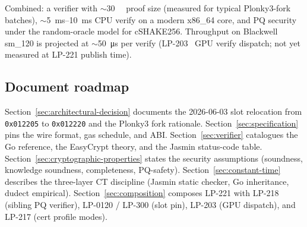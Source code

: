 Combined: a verifier with $\sim$\SI{30}{\kilo\byte} proof size
(measured for typical Plonky3-fork batches),
$\sim$\SIrange{5}{10}{\milli\second} CPU verify on a modern x86\_64
core, and PQ security under the random-oracle model for cSHAKE256.
Throughput on Blackwell sm\_120 is projected at $\sim$\SI{50}{\micro\second}
per verify (LP-203~\cite{lp203} GPU verify dispatch; not yet
measured at LP-221 publish time).

\subsection{Document roadmap}

Section~\ref{sec:architectural-decision} documents the 2026-06-03
slot relocation from \texttt{0x012205} to \texttt{0x012220} and
the Plonky3 fork rationale. Section~\ref{sec:specification} pins
the wire format, gas schedule, and ABI.
Section~\ref{sec:verifier} catalogues the Go reference, the
EasyCrypt theory, and the Jasmin status-code table.
Section~\ref{sec:cryptographic-properties} states the security
assumptions (soundness, knowledge soundness, completeness,
PQ-safety). Section~\ref{sec:constant-time} describes the
three-layer CT discipline (Jasmin static checker, Go inheritance,
dudect empirical).
Section~\ref{sec:composition} composes LP-221 with LP-218 (sibling
PQ verifier), LP-0120 / LP-300 (slot pin), LP-203 (GPU dispatch),
and LP-217 (cert profile modes).
